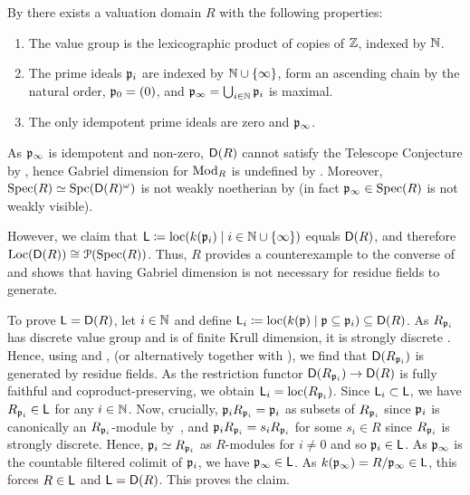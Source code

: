 \documentclass[reqno,a4paper]{amsart}
\begin{document}
\begin{example}\label{ex:ce}
    By \cite[Proposition 5.1, Remark 5.2]{bt25} there exists a valuation domain $R$ with the following properties:
\begin{enumerate}
    \item The value group is the lexicographic product of copies of $\mathbb{Z}$, indexed by $\mathbb{N}$. 
    \item The prime ideals $\mathfrak{p}_i$ are indexed by $\mathbb{N}\cup\{\infty\}$, form an ascending chain by the natural order, $\mathfrak{p}_0=(0)$, and $\mathfrak{p}_\infty=\bigcup_{i\in\mathbb{N}}\mathfrak{p}_i$ is maximal.
    \item The only idempotent prime ideals are zero and $\mathfrak{p}_\infty$.
\end{enumerate}
    As $\mathfrak{p}_\infty$ is idempotent and non-zero, $\mathsf{D}(R)$ cannot satisfy the Telescope Conjecture by \cite[\S7]{gldm1}, hence Gabriel dimension for $\operatorname{Mod}_R$ is undefined by . Moreover,
    $\operatorname{Spec}(R)\simeq\operatorname{Spc}(\mathsf{D}(R)^\omega)$ is not weakly noetherian by  (in fact $\mathfrak{p}_\infty\in\operatorname{Spec}(R)$ is not weakly visible).

    However, we claim that  $\mathsf{L}\coloneqq\operatorname{loc}(k(\mathfrak{p}_i)\mid i\in\mathbb{N}\cup\{\infty\})$ equals $\mathsf{D}(R)$, and therefore $\operatorname{Loc}(\mathsf{D}(R))\cong\mathcal{P}(\operatorname{Spec}(R))$. Thus, $R$ provides a counterexample to the converse of \cite[Theorem 2.1]{isolated} and shows that having Gabriel dimension is not necessary for residue fields to generate.
    
    To prove $\mathsf{L}=\mathsf{D}(R)$, let $i\in\mathbb{N}$ and define $\mathsf{L}_i\coloneqq\operatorname{loc}(k(\mathfrak{p})\mid \mathfrak{p}\subseteq \mathfrak{p}_i)\subseteq\mathsf{D}(R)$. As $R_{\mathfrak{p}_i}$ has discrete value group and is of finite Krull dimension, it is strongly discrete \cite[Proposition~II.8.4]{fs01}. Hence, using  and , (or alternatively  together with \cite[Theorem 2.1]{isolated}), we find that $\mathsf{D}(R_{\mathfrak{p}_i})$ is generated by residue fields. As the restriction functor $\mathsf{D}(R_{\mathfrak{p}_i})\to \mathsf{D}(R)$ is fully faithful and coproduct-preserving, we obtain $\mathsf{L}_i=\operatorname{loc}(R_{\mathfrak{p}_i})$. Since $\mathsf{L}_i\subset \mathsf{L}$, we have $R_{\mathfrak{p}_i}\in \mathsf{L}$ for any $i\in\mathbb{N}$. Now, crucially, $\mathfrak{p}_i R_{\mathfrak{p}_i} = \mathfrak{p}_i$ as subsets of $R_{\mathfrak{p}_i}$ since $\mathfrak{p}_i$ is canonically an $R_{\mathfrak{p}_i}$-module by~\cite[Lemma~4.3(iv)]{fs01}, and $\mathfrak{p}_iR_{\mathfrak{p}_i}=s_iR_{\mathfrak{p}_i}$ for some $s_i\in R$ since $R_{\mathfrak{p}_i}$ is strongly discrete.
    Hence, $\mathfrak{p}_i\simeq R_{\mathfrak{p}_i}$ as $R$-modules for $i\neq0$ and so $\mathfrak{p}_i\in\mathsf{L}$. As $\mathfrak{p}_\infty$ is the countable filtered colimit of $\mathfrak{p}_i$, we have $\mathfrak{p}_\infty\in\mathsf{L}$. As $k(\mathfrak{p}_\infty)=R/\mathfrak{p}_\infty\in\mathsf{L}$, this forces $R\in\mathsf{L}$ and $\mathsf{L}=\mathsf{D}(R)$. This proves the claim.


\end{example}
\end{document}
